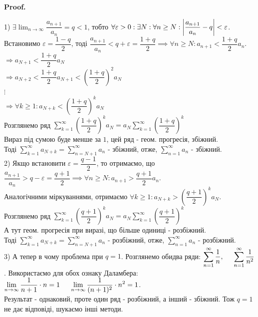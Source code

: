 \documentclass[a4paper, 10pt]{article}
\makeatletter
\def\huge{\displaystyle}
\def\qed{$\blacksquare$}
\theoremstyle{theoremdd}
\theoremstyle{theoremdd}
\theoremstyle{theoremdd}
\theoremstyle{theoremdd}
\theoremstyle{theoremdd}
\theoremstyle{theoremdd}
\theoremstyle{theoremdd}
\theoremstyle{theoremdd}
\renewenvironment{proof}[1][Proof.\\]{\par
\pushQED{\hfill \qed}%
\normalfont \topsep6\p@\@plus6\p@\relax
\trivlist
\item\relax
{\bfseries
#1\@addpunct{.}}\hspace\labelsep\ignorespaces
}{%
\popQED\endtrivlist\@endpefalse
}
\makeatother
\begin{document}
\begin{proof}
1) $\exists \huge \lim_{n \to \infty} \dfrac{a_{n+1}}{a_n} = q <1$, тобто $\forall \varepsilon > 0: \exists N: \forall n \geq N: \abs{\dfrac{a_{n+1}}{a_n} - q} < \varepsilon$.\\
Встановимо $\varepsilon = \dfrac{1-q}{2}$, тоді $\dfrac{a_{n+1}}{a_n} < q + \varepsilon = \dfrac{1+q}{2} \implies \forall n \geq N: a_{n+1} < \dfrac{1+q}{2}a_n$.\\
$\Rightarrow a_{N+1} < \dfrac{1+q}{2}a_N$\\
$\Rightarrow a_{N+2} < \dfrac{1+q}{2}a_{N+1} < \left( \dfrac{1+q}{2} \right)^2 a_N$\\
$\vdots$\\
$\Rightarrow \forall k \geq 1: a_{N+k} < \left( \dfrac{1+q}{2} \right)^k a_N$\\
Розглянемо ряд $\huge \sum_{k=1}^{\infty} \left( \dfrac{1+q}{2} \right)^k a_N = a_N \sum_{k=1}^{\infty} \left( \dfrac{1+q}{2} \right)^k$\\
Вираз під сумою буде менше за $1$, цей ряд - геом. прогресія, збіжний.\\
Тоді $\huge \sum_{k=1}^{\infty} a_{N+k} = \sum_{n = N+1}^{\infty} a_{n}$ - збіжний, отже, $\huge \sum_{n = 1}^{\infty} a_n$ - збіжний.
\bigskip \\
2) Якщо встановити $\varepsilon = \dfrac{q-1}{2}$, то отримаємо, що $\dfrac{a_{n+1}}{a_n} > q - \varepsilon = \dfrac{q+1}{2} \implies \forall n \geq N: a_{n+1} > \dfrac{q+1}{2}a_n$.\\
Аналогічними міркуваннями, отримаємо $\forall k \geq 1: a_{N+k} > \left( \dfrac{q+1}{2} \right)^k a_N$.\\
Розглянемо ряд $\huge \sum_{k=1}^{\infty} \left( \dfrac{q+1}{2} \right)^k a_N = a_N \sum_{k=1}^{\infty} \left( \dfrac{q+1}{2} \right)^k$\\
А тут геом. прогресія при виразі, що більше одиниці - розбіжний.\\
Тоді $\huge \sum_{k=1}^{\infty} a_{N+k} = \sum_{n = N+1}^{\infty} a_{n}$ - розбіжний, отже, $\huge \sum_{n = 1}^{\infty} a_n$ - розбіжний.
\bigskip \\
3) А тепер в чому проблема при $q = 1$. Розглянемо обидва ряди: $\huge \sum_{n=1}^\infty \dfrac{1}{n}, \hspace{0.5cm} \sum_{n=1}^\infty \dfrac{1}{n^2}$.
Використаємо для обох ознаку Даламбера:\\
$\huge \lim_{n \to \infty} \dfrac{1}{n+1} \cdot n = 1 \hspace{0.5cm} \lim_{n \to \infty} \dfrac{1}{(n+1)^2} \cdot n^2 = 1$.\\
Результат - однаковий, проте один ряд - розбіжний, а інший - збіжний. Тож $q = 1$ не дає відповіді, шукаємо інші методи.
\end{proof}
\end{document}

